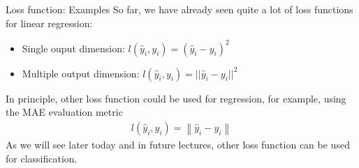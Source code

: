 \begin{parag}{Loss function: Examples}
    So far, we have already seen quite a lot of loss functions for linear regression:
	\begin{itemize}
	    \item Single ouput dimension: $l\left(\hat{y}_i, y_i\right) = \left(\hat{y}_i - y_i\right)^2$
	    \item Multiple output dimension: $l\left(\hat{y}_i, y_i\right) = || \hat{y}_i - y_i||^2$
	\end{itemize}
	In principle, other loss function could be used for regression, for example, using the MAE evaluation metric
	\begin{align*} 
	l\left(\hat{y}_i, y_i\right) = \left\|\hat{y}_i - y_i\right\|
	\end{align*}
	As we will see later today and in future lectures, other loss function can be used for classification.
\end{parag}

